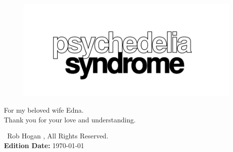
\newpage
\ %
\thispagestyle{empty}%
\newpage
\clearpage
\vspace*{\fill}
\begin{figure}[H]
    \centering
      \includegraphics[width=12cm]{src/cover/title_page.png}%
\end{figure}
\vspace*{\fill}

\thispagestyle{empty}%
\clearpage
\thispagestyle{empty}%

\vspace*{\fill}
For my beloved wife Edna.\\
Thank you for your love and understanding.\\
\bigskip
\vspace*{\fill}

\textcopyright\ Rob Hogan \the\year{}, All Rights Reserved. \\
\textbf{Edition Date:} \today

\doclicenseThis
\clearpage
